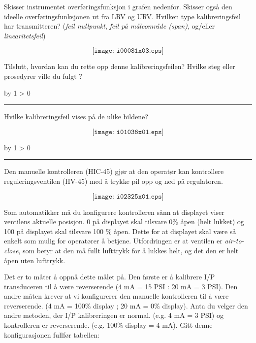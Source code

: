 \documentclass[12pt,a4paper]{article}
\def\oppgave{
            \advance\questnum by 1
            \ifnum \questnum > 0
                 \hrule
                 \vskip 3pt
                 \leftline{Oppgave \the\questnum}
                 \vskip 3pt \fi}
\begin{document}
Skisser instrumentet overføringsfunksjon i grafen nedenfor. Skisser også den ideelle overføringsfunksjonen ut fra LRV og URV. Hvilken type kalibreringsfeil har transmitteren?  ({\it feil nullpunkt}, {\it feil på måleområde (span)}, og/eller {\it linearitetsfeil})

$$\texttt{[image: i00081x03.eps]}$$

Tilslutt, hvordan kan du rette opp denne kalibreringsfeilen? Hvilke steg eller prosedyrer ville du fulgt ?


\vskip 10pt \filbreak 
\oppgave{} 

Hvilke kalibreringsfeil vises på de ulike bildene?

$$\texttt{[image: i01036x01.eps]}$$


\vskip 10pt \filbreak 
\oppgave{} 

Den manuelle kontrolleren (HIC-45) gjør at den operatør kan kontrollere reguleringsventilen (HV-45) med å trykke pil opp og ned på regulatoren.

$$\texttt{[image: i02325x01.eps]}$$

Som automatikker må du konfigurere kontrolleren sånn at displayet viser ventilens aktuelle posisjon. 0 på displayet skal tilsvare 0\% åpen (helt lukket) og 100 på displayet skal tilsvare 100 \% åpen. Dette for at displayet skal være så enkelt som mulig for operatører å betjene. Utfordringen er at ventilen er \textit{air-to-close}, som betyr at den må fullt lufttrykk for å lukkes helt, og det den er helt åpen uten lufttrykk.  

\vskip 10pt

Det er to måter å oppnå dette målet på. Den første er å kalibrere I/P transduceren til å være reverserende (4 mA = 15 PSI : 20 mA = 3 PSI). Den andre måten krever at vi konfigurerer den manuelle kontrolleren til å være reverserende. (4 mA = 100\% display ; 20 mA = 0\% display). Anta du velger den andre metoden, der I/P kalibreringen er normal. (e.g. 4 mA = 3 PSI) og kontrolleren er reverserende. (e.g. 100\% display = 4 mA). Gitt denne konfigurasjonen fullfør tabellen:
\end{document}
